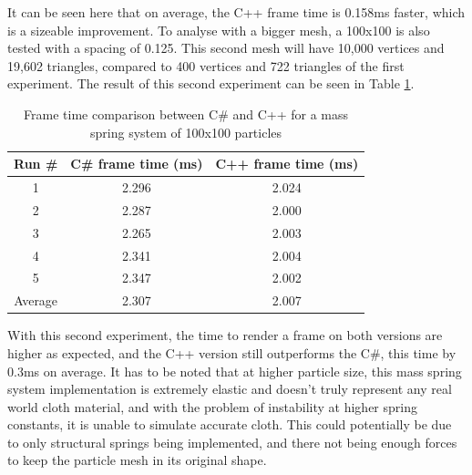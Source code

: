 \documentclass[12pt,a4paper]{article}
\begin{document}
It can be seen here that on average, the C++ frame time is 0.158ms faster, which is a sizeable improvement. To analyse with a bigger mesh, a 100x100 is also tested with a spacing of 0.125. This second mesh will have 10,000 vertices and 19,602 triangles, compared to 400 vertices and 722 triangles of the first experiment. The result of this second experiment can be seen in Table \ref{tab:lang2}. \\
\begin{table}[htbp]
	\centering
	\begin{tabular}{|c|c|c|} %
		\hline %
		Run \# & C\# frame time (ms) &  C++ frame time (ms) \\ %
		\hline %
		1 & 2.296 & 2.024 \\ 
		2 & 2.287 & 2.000 \\ 
		3 & 2.265 & 2.003 \\ 
		4 & 2.341 & 2.004  \\ 
		5 & 2.347 & 2.002  \\ 
		\hline
		Average & 2.307 & 2.007 \\ 
		\hline %
	\end{tabular}
	\caption{Frame time comparison between C\# and C++ for a mass spring system of 100x100 particles} %
	\label{tab:lang2}
\end{table}

With this second experiment, the time to render a frame on both versions are higher as expected, and the C++ version still outperforms the C\#, this time by 0.3ms on average. It has to be noted that at higher particle size, this mass spring system implementation is extremely elastic and doesn't truly represent any real world cloth material, and with the problem of instability at higher spring constants, it is unable to simulate accurate cloth. This could potentially be due to only structural springs being implemented, and there not being enough forces to keep the particle mesh in its original shape. \\
\end{document}
